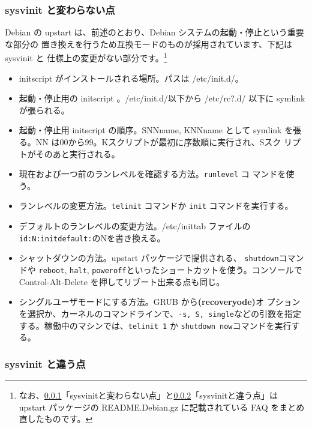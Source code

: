 \documentclass[mingoth,a4paper]{jsarticle}
\begin{document}
\subsubsection{sysvinit と変わらない点}
\label{se:same-sysvinit}

Debian の upstart は、前述のとおり、Debian システムの起動・停止という重要な部分の
置き換えを行うため互換モードのものが採用されています、下記は sysvinit と
仕様上の変更がない部分です。\footnote{なお、\ref{se:same-sysvinit}「sysvinitと変わらない点」と\ref{se:difference-sysvinit}「sysvinitと違う点」は upstart パッケージの README.Debian.gz に記載されている FAQ をまとめ直したものです。}

\begin{itemize}
 \item initscript がインストールされる場所。パスは /etc/init.d/。
 \item 起動・停止用の initscript 。/etc/init.d/以下から /etc/rc?.d/
       以下に symlink が張られる。
 \item 起動・停止用 initscript の順序。SNNname, KNNname として symlink
       を張る。NN は00から99。Kスクリプトが最初に序数順に実行され、Sスク
       リプトがそのあと実行される。
 \item 現在および一つ前のランレベルを確認する方法。\texttt{runlevel} コ
       マンドを使う。
 \item ランレベルの変更方法。\texttt{telinit} コマンドか \texttt{init}
       コマンドを実行する。
 \item デフォルトのランレベルの変更方法。/etc/inittab ファイルの
       \texttt{id:N:initdefault:}のNを書き換える。
 \item シャットダウンの方法。upstart パッケージで提供される、
       \texttt{shutdown}コマンドや \texttt{reboot}, \texttt{halt},
       \texttt{poweroff}といったショートカットを使う。コンソールで
       Control-Alt-Delete を押してリブート出来る点も同じ。
\item シングルユーザモードにする方法。GRUB から\textbf{(recoveryode)}オ
      プションを選択か、カーネルのコマンドラインで、\texttt{-s, S,
      single}などの引数を指定する。稼働中のマシンでは、\texttt{telinit
      1} か \texttt{shutdown now}コマンドを実行する。
\end{itemize}

\subsubsection{sysvinit と違う点}
\label{se:difference-sysvinit}
\end{document}
